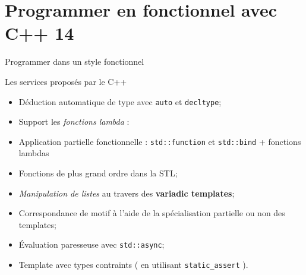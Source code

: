 \documentclass[handout,10pt]{beamer}
\begin{document}
\section{Programmer en fonctionnel avec C++ 14}

\begin{frame}[fragile]{Programmer dans un style fonctionnel}
\tiny
\begin{block}{Les services proposés par le C++}
\begin{itemize}
\item Déduction automatique de type avec \lstinline$auto$ et \lstinline$decltype$;
\item Support les \textsl{fonctions lambda} :
\item Application partielle fonctionnelle : \lstinline$std::function$ et \lstinline$std::bind$ + fonctions lambdas
\item Fonctions de plus grand ordre dans la STL;
\item \textsl{Manipulation de listes} au travers des \textbf{variadic templates};
\item Correspondance de motif à l'aide de la spécialisation partielle ou non des templates;
\item \'Evaluation paresseuse avec \lstinline$std::async$;
\item Template avec types contraints ( en utilisant \lstinline$static_assert$ ).
\end{itemize}
\end{block}
\end{frame}
\end{document}
